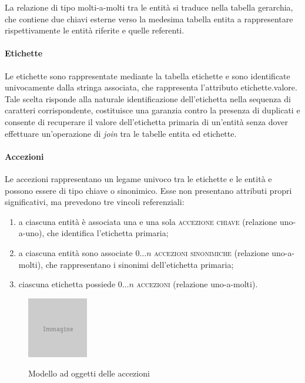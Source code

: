 La relazione di tipo molti-a-molti tra le entità si traduce nella tabella \textsf{gerarchia}, che contiene due chiavi esterne verso la medesima tabella \textsf{entita} a rappresentare rispettivamente le entità riferite e quelle referenti.

\paragraph{Etichette}
Le etichette sono rappresentate mediante la tabella \textsf{etichette} e sono identificate univocamente dalla stringa associata, che rappresenta l'attributo \textsf{etichette.valore}. Tale scelta risponde alla naturale identificazione dell'etichetta nella sequenza di caratteri corrispondente, costituisce una garanzia contro la presenza di duplicati e consente di recuperare il valore dell'etichetta primaria di un'entità senza dover effettuare un'operazione di \textit{join} tra le tabelle \textsf{entita} ed \textsf{etichette}.

\paragraph{Accezioni}
Le accezioni rappresentano un legame univoco tra le etichette e le entità e possono essere di tipo chiave o sinonimico. Esse non presentano attributi propri significativi, ma prevedono tre vincoli referenziali:
\begin{enumerate}
\item a ciascuna entità è associata una e una sola \textsc{accezione chiave} (relazione uno-a-uno), che identifica l'etichetta primaria;
\item a ciascuna entità sono associate $0\ldots n$ \textsc{accezioni sinonimiche} (relazione uno-a-molti), che rappresentano i sinonimi dell'etichetta primaria;
\item ciascuna etichetta possiede $0\ldots n$ \textsc{accezioni} (relazione uno-a-molti).
\end{enumerate}

\begin{figure}[ht]
\begin{center}
\includegraphics{placeholder.png}
\label{fig:tesi:stage:er:accezioni}
\caption{Modello ad oggetti delle accezioni}
\end{center}
\end{figure}

